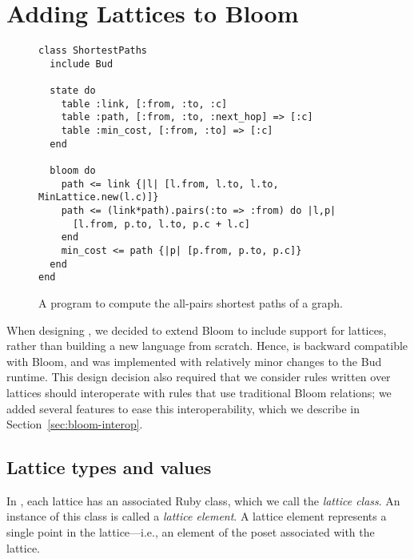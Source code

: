 \section{Adding Lattices to Bloom}
\label{sec:impl}

\begin{figure}[t]
\begin{scriptsize}
\begin{lstlisting}
class ShortestPaths
  include Bud

  state do
    table :link, [:from, :to, :c]
    table :path, [:from, :to, :next_hop] => [:c]
    table :min_cost, [:from, :to] => [:c]
  end

  bloom do
    path <= link {|l| [l.from, l.to, l.to, MinLattice.new(l.c)]}
    path <= (link*path).pairs(:to => :from) do |l,p|
      [l.from, p.to, l.to, p.c + l.c]
    end
    min_cost <= path {|p| [p.from, p.to, p.c]}
  end
end
\end{lstlisting}
\end{scriptsize}
\caption{A \lang program to compute the all-pairs shortest paths of a
  graph.}
\label{fig:lattice-spaths}
\end{figure}



When designing \lang, we decided to extend Bloom to include support for
lattices, rather than building a new language from scratch. Hence, \lang is
backward compatible with Bloom, and was implemented with relatively minor
changes to the Bud runtime. This design decision also required that we consider
rules written over lattices should interoperate with rules that use traditional
Bloom relations; we added several \lang features to ease this interoperability,
which we describe in Section~\ref{sec:bloom-interop}.

\subsection{Lattice types and values}
In \lang, each lattice has an associated Ruby class, which we call the
\emph{lattice class}. An instance of this class is called a \emph{lattice
  element}. A lattice element represents a single point in the lattice---i.e., an
element of the poset associated with the lattice.

